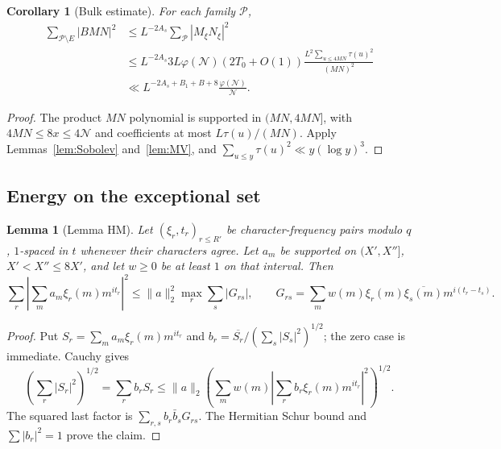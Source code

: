\documentclass[11pt]{article}
\newtheorem{lemma}[theorem]{Lemma}
\newtheorem{corollary}[theorem]{Corollary}
\theoremstyle{definition}
\newcommand{\ph}{\varphi}
\newcommand{\GN}{\mathcal N}
\theoremstyle{remark}
\numberwithin{equation}{section}
\begin{document}
\begin{corollary}[Bulk estimate]\label{cor:bulk}
For each family $\mathcal P$,
\begin{equation}\label{eq:bulk}
 \begin{split}
 \sum_{\mathcal P\setminus E}|BMN|^2
 &\le L^{-2A_s}\sum_\mathcal P|M_\xi N_\xi|^2\\
 &\le L^{-2A_s}3L\ph(\GN)(2T_0+O(1))
           \frac{L^2\sum_{u\le4MN}\tau(u)^2}{(MN)^2}\\
 &\ll L^{-2A_s+B_1+B+8}\frac{\ph(\GN)}{\GN}.
 \end{split}
\end{equation}
\end{corollary}
\begin{proof}
The product $MN$ polynomial is supported in $(MN,4MN]$, with
$4MN\le8x\le4\GN$ and coefficients at most $L\tau(u)/(MN)$.
Apply Lemmas~\ref{lem:Sobolev} and~\ref{lem:MV}, and
$\sum_{u\le y}\tau(u)^2\ll y(\log y)^3$.
\end{proof}

\subsection{Energy on the exceptional set}\label{subsec:HM}
\begin{lemma}[Lemma HM]\label{lem:HM}
Let $(\xi_r,t_r)_{r\le R'}$ be character-frequency pairs modulo $q$,
$1$-spaced in $t$ whenever their characters agree.
Let $a_m$ be supported on $(X',X'']$, $X'<X''\le8X'$, and let
$w\ge0$ be at least $1$ on that interval. Then
\begin{equation}\label{eq:HM}
 \sum_r\left|\sum_ma_m\xi_r(m)m^{it_r}\right|^2
 \le\|a\|_2^2\max_r\sum_s|G_{rs}|,\qquad
 G_{rs}=\sum_mw(m)\xi_r(m)\overline{\xi_s(m)}m^{i(t_r-t_s)}.
\end{equation}
\end{lemma}
\begin{proof}
Put $S_r=\sum_ma_m\xi_r(m)m^{it_r}$ and
$b_r=\overline{S_r}/(\sum_s|S_s|^2)^{1/2}$; the zero case is
immediate. Cauchy gives
\[
 (\sum_r|S_r|^2)^{1/2}=\sum_rb_rS_r
 \le\|a\|_2\left(\sum_mw(m)
           \left|\sum_rb_r\xi_r(m)m^{it_r}\right|^2\right)^{1/2}.
\]
The squared last factor is $\sum_{r,s}b_r\bar b_sG_{rs}$.
The Hermitian Schur bound and $\sum|b_r|^2=1$ prove the claim.
\end{proof}
\end{document}
